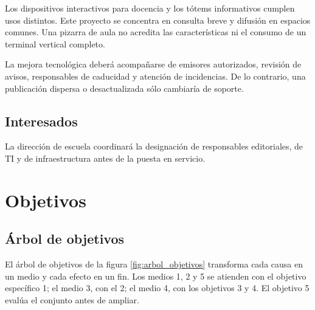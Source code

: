 Los dispositivos interactivos para docencia y los tótems informativos cumplen usos distintos. Este proyecto se concentra en consulta breve y difusión en espacios comunes. Una pizarra de aula no acredita las características ni el consumo de un terminal vertical completo.

La mejora tecnológica deberá acompañarse de emisores autorizados, revisión de avisos, responsables de caducidad y atención de incidencias. De lo contrario, una publicación dispersa o desactualizada sólo cambiaría de soporte.

\subsection{Interesados}
La dirección de escuela coordinará la designación de responsables editoriales, de TI y de infraestructura antes de la puesta en servicio.

\section{Objetivos}
\subsection{Árbol de objetivos}
El árbol de objetivos de la figura \ref{fig:arbol_objetivos} transforma cada causa en un medio y cada efecto en un fin. Los medios 1, 2 y 5 se atienden con el objetivo específico 1; el medio 3, con el 2; el medio 4, con los objetivos 3 y 4. El objetivo 5 evalúa el conjunto antes de ampliar.

